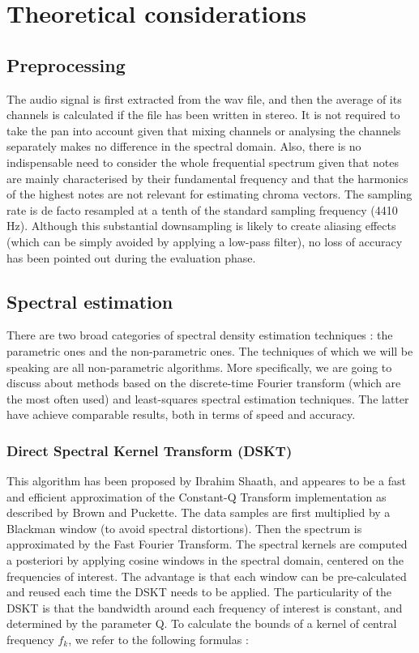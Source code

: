 \documentclass[letterpaper]{article}
\begin{document}
\section{Theoretical considerations}

\subsection{Preprocessing}

The audio signal is first extracted from the wav file, and then the average of its channels is calculated
if the file has been written in stereo. It is not required to take the pan into account given that mixing
channels or analysing the channels separately makes no difference in the spectral domain. Also, there is
no indispensable need to consider the whole frequential spectrum given that notes are mainly characterised 
by their fundamental frequency
and that the harmonics of the highest notes are not relevant for estimating chroma vectors.
The sampling rate is de facto resampled at a tenth of the standard sampling frequency (4410 Hz).
Although this substantial downsampling is likely to create aliasing effects (which can be simply avoided by 
applying a low-pass filter), no loss of accuracy has been pointed out during the evaluation phase.

\subsection{Spectral estimation}

There are two broad categories of spectral density estimation techniques : the parametric ones and the non-parametric ones. \citep{MHH} The techniques
of which we will be speaking are all non-parametric algorithms. More specifically, we are going to discuss about methods based on the discrete-time Fourier transform (which are the most often used) and least-squares spectral estimation techniques. The latter have achieve comparable results, both in terms of speed and accuracy.

\subsubsection{Direct Spectral Kernel Transform (DSKT)}

This algorithm has been proposed by Ibrahim Sha\textquotesingle ath, and appeares to be a fast and efficient approximation of the Constant-Q Transform implementation as described by Brown and Puckette.
The data samples are first multiplied by a Blackman window (to avoid spectral distortions). Then the spectrum is approximated by the Fast Fourier Transform.
The spectral kernels are computed a posteriori by applying cosine windows in the spectral domain, centered on the frequencies of interest. The advantage is that each window can be pre-calculated and reused each time the DSKT needs to be applied. The particularity of the DSKT is that the bandwidth around each frequency of interest is constant, and determined by the parameter Q. To calculate the bounds of a kernel of central frequency $ f_k $, we refer to the following formulas :
\end{document}
